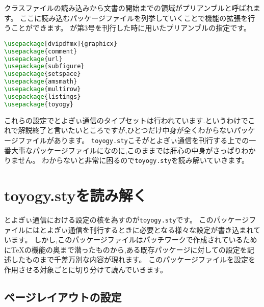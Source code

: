 クラスファイルの読み込みから文書の開始までの領域がプリアンブルと呼ばれます。
ここに読み込むパッケージファイルを列挙していくことで機能の拡張を行うことができます。
が第3号を刊行した時に用いたプリアンブルの指定です。
\begin{lstlisting}[caption=プリアンブル,label=lis:preamble,language=tex]
\usepackage[dvipdfmx]{graphicx}
\usepackage{comment}
\usepackage{url}
\usepackage{subfigure}
\usepackage{setspace}
\usepackage{amsmath}
\usepackage{multirow}
\usepackage{listings}
\usepackage{toyogy}
\end{lstlisting}

これらの設定でとよぎぃ通信のタイプセットは行われています.というわけでこれで解説終了と言いたいところですが,ひとつだけ中身が全くわからないパッケージファイルがあります。
\texttt{toyogy.sty}こそがとよぎぃ通信を刊行する上での一番大事なパッケージファイルになのに,このままでは肝心の中身がさっぱりわかりません。
わからないと非常に困るので\texttt{toyogy.sty}を読み解いていきます。

\section{toyogy.styを読み解く}

とよぎぃ通信における設定の核を為すのが\texttt{toyogy.sty}です。
このパッケージファイルにはとよぎぃ通信を刊行するときに必要となる様々な設定が書き込まれています。
しかし,このパッケージファイルはパッチワークで作成されているために{\TeX}の機能の奥まで潜ったものから,ある既存パッケージに対しての設定を記述したものまで千差万別な内容が現れます。
このパッケージファイルを設定を作用させる対象ごとに切り分けて読んでいきます。

\subsection{ページレイアウトの設定}

